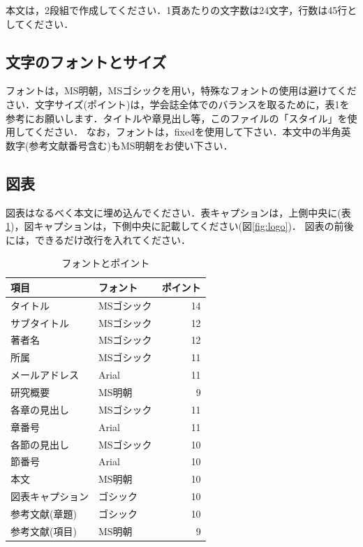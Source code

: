 \documentclass[dvipdfmx]{jaeis-journal}
\begin{document}
本文は，2段組で作成してください．1頁あたりの文字数は24文字，行数は45行としてください．

\subsection{文字のフォントとサイズ}

フォントは，MS明朝，MSゴシックを用い，特殊なフォントの使用は避けてください．文字サイズ(ポイント)は，学会誌全体でのバランスを取るために，表1を参考にお願いします．タイトルや章見出し等，このファイルの「スタイル」を使用してください．
なお，フォントは，fixedを使用して下さい．本文中の半角英数字(参考文献番号含む)もMS明朝をお使い下さい．

\subsection{図表}

図表はなるべく本文に埋め込んでください．表キャプションは，上側中央に(表\ref{tab:font})，図キャプションは，下側中央に記載してください(図\ref{fig:logo})．
図表の前後には，できるだけ改行を入れてください．

\begin{table}[htb]
	\caption{フォントとポイント}
	\label{tab:font}
	\begin{tabularx}{\columnwidth}{llr}
		\hline
		\textbf{項目} & \textbf{フォント} & \textbf{ポイント} \\ \hline
		タイトル & MSゴシック & 14 \\
		サブタイトル & MSゴシック & 12 \\
		著者名 & MSゴシック & 12 \\
		所属 & MSゴシック & 11 \\
		メールアドレス & Arial & 11 \\
		研究概要 & MS明朝 & 9 \\
		各章の見出し & MSゴシック & 11 \\
		章番号 & Arial & 11 \\
		各節の見出し & MSゴシック & 10 \\
		節番号 & Arial & 10 \\
		本文 & MS明朝 & 10 \\
		図表キャプション & ゴシック & 10 \\
		参考文献(章題) & ゴシック & 10 \\
		参考文献(項目) & MS明朝 & 9 \\
		\hline
	\end{tabularx}
\end{table}
\end{document}
